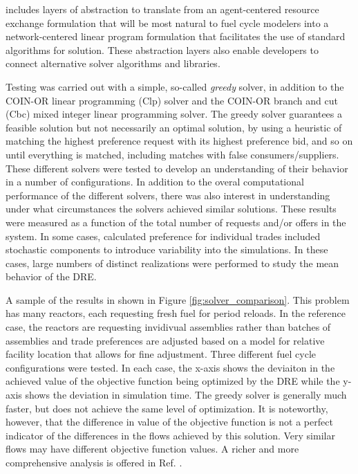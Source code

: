 \Cyclus{} includes layers of abstraction to translate from an agent-centered
resource exchange formulation that will be most natural to fuel cycle modelers
into a network-centered linear program formulation that facilitates the use of
standard algorithms for solution.  These abstraction layers also enable
developers to connect alternative solver algorithms and libraries.

Testing was carried out with a simple, so-called \textit{greedy} solver, in
addition to the \gls{COIN-OR} linear programming (Clp) solver and the
\gls{COIN-OR} branch and cut (Cbc) mixed integer linear programming solver.
The greedy solver guarantees a feasible solution but not necessarily an
optimal solution, by using a heuristic of matching the highest preference
request with its highest preference bid, and so on until everything is
matched, including matches with false consumers/suppliers.  These different
solvers were tested to develop an understanding of their behavior in a number
of configurations.\cite{gidden_thesis} In addition to the overal computational
performance of the different solvers, there was also interest in understanding
under what circumstances the solvers achieved similar solutions.  These
results were measured as a function of the total number of requests and/or
offers in the system.  In some cases, calculated preference for individual
trades included stochastic components to introduce variability into the
simulations.  In these cases, large numbers of distinct realizations were
performed to study the mean behavior of the \gls{DRE}.

A sample of the results in shown in Figure \ref{fig:solver_comparison}.  This
problem has many reactors, each requesting fresh fuel for period reloads.  In
the reference case, the reactors are requesting invidivual assemblies rather
than batches of assemblies and trade preferences are adjusted based on a model
for relative facility location that allows for fine adjustment.  Three
different fuel cycle configurations were tested. In each case, the x-axis
shows the deviaiton in the achieved value of the objective function being
optimized by the \gls{DRE} while the y-axis shows the deviation in simulation
time.  The greedy solver is generally much faster, but does not achieve the
same level of optimization.  It is noteworthy, however, that the difference in
value of the objective function is not a perfect indicator of the differences
in the flows achieved by this solution.  Very similar flows may have different
objective function values.  A richer and more comprehensive analysis is
offered in Ref. \cite{gidden_thesis}.

